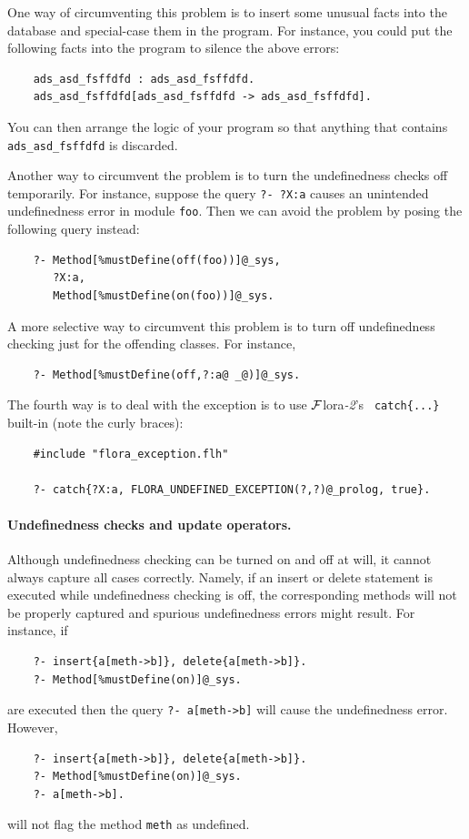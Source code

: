 \documentclass[11pt]{article}
\newcommand{\FLORA}{{\mbox{\sc ${\cal F}${lora}\rm\emph{-2}}}\xspace}
\begin{document}
One way of circumventing this problem is to insert some unusual facts into the
database and special-case them in the program. For instance, you could put
the following facts into the program to silence the above errors:
\begin{verbatim}
    ads_asd_fsffdfd : ads_asd_fsffdfd.
    ads_asd_fsffdfd[ads_asd_fsffdfd -> ads_asd_fsffdfd].
\end{verbatim}
You can then arrange the logic of your program so that anything that contains
{\tt ads\_asd\_fsffdfd} is discarded.

Another way to circumvent  the problem is to turn the undefinedness checks
off temporarily. For instance, suppose the query {\tt ?- ?X:a} causes
an unintended undefinedness error in module {\tt foo}. Then we can avoid the
problem by posing the following query instead:
\begin{verbatim}
    ?- Method[%mustDefine(off(foo))]@_sys,
       ?X:a,
       Method[%mustDefine(on(foo))]@_sys.
\end{verbatim}
A more selective way to circumvent this problem is to turn off
undefinedness checking just for the offending classes. For instance,
\begin{verbatim}
    ?- Method[%mustDefine(off,?:a@ _@)]@_sys.
\end{verbatim}

The fourth way is to deal with the exception is to use \FLORA's {\tt
  catch\{...\}} built-in (note the curly braces):
\begin{verbatim}
    #include "flora_exception.flh"

    ?- catch{?X:a, FLORA_UNDEFINED_EXCEPTION(?,?)@_prolog, true}.
\end{verbatim}

\paragraph{Undefinedness checks and update operators.}
Although undefinedness checking can be turned on and off at will, it cannot
always capture all cases correctly. Namely, if an insert or delete
statement is executed while undefinedness checking is off, the
corresponding methods will not be properly captured and spurious
undefinedness errors might result.
For instance, if
\begin{verbatim}
    ?- insert{a[meth->b]}, delete{a[meth->b]}.
    ?- Method[%mustDefine(on)]@_sys.
\end{verbatim}
are executed then the query {\tt ?- a[meth->b]} will cause the
undefinedness error. However,
\begin{verbatim}
    ?- insert{a[meth->b]}, delete{a[meth->b]}.
    ?- Method[%mustDefine(on)]@_sys.
    ?- a[meth->b].
\end{verbatim}
will not flag the method {\tt meth} as undefined.
\end{document}
